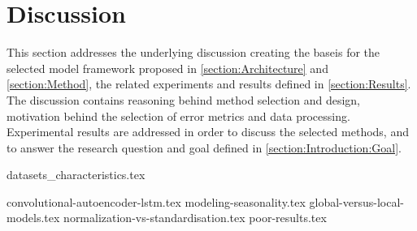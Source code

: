 
\section{Discussion}
\label{section:Discussion:Discussion}

This section addresses the underlying discussion creating the baseis for the selected model framework proposed in \cref{section:Architecture} and \cref{section:Method},
the related experiments and results defined in \cref{section:Results}.
The discussion contains reasoning behind method selection and design,
motivation behind the selection of error metrics and data processing.
Experimental results are addressed in order to discuss the selected methods, and to answer the research question and goal defined in \cref{section:Introduction:Goal}.


\iffalse
This section presents the underlying discussion creating the basis for the model framework proposed in \Cref{section:Architecture}.
The discussion concerns the current state of time-series prediction, the motivation behind the method selection, model structure, and the selected error metric.
This section intendeds to answer the research questions proposed in this paper,
as well as the reason behind the framework.
\fi

{datasets_characteristics.tex}

{convolutional-autoencoder-lstm.tex}
{modeling-seasonality.tex}
{global-versus-local-models.tex}
{normalization-vs-standardisation.tex}
{poor-results.tex}







